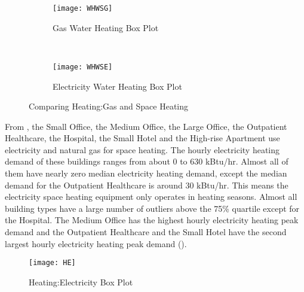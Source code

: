 \begin{figure}[h!]
  \centering
  \begin{subfigure}{0.4\textwidth}
  \centering
  \texttt{[image: WHWSG]}
  \caption[Gas Water Heating Box Plot]{Gas Water Heating Box Plot}
  \label{fig:WHWSG}
\end{subfigure}
~
\begin{subfigure}{0.4\textwidth}
  \centering
  \texttt{[image: WHWSE]}
  \caption[Electricity Water Heating Box Plot]{Electricity Water Heating Box Plot}
\end{subfigure}
\caption[Comparing Heating:Gas and Space Heating]{Comparing
  Heating:Gas and Space Heating}
\end{figure}

From , the Small Office, the Medium Office, the
Large Office, the Outpatient Healthcare, the Hospital, the Small Hotel
and the High-rise Apartment use electricity and natural gas for space
heating. The hourly electricity heating demand of these buildings
ranges from about 0 to 630 kBtu/hr. Almost all of them have nearly
zero median electricity heating demand, except the median demand for
the Outpatient Healthcare is around 30 kBtu/hr. This means the
electricity space heating equipment only operates in heating seasons.
Almost all building types have a large number of outliers above the
75\% quartile except for the Hospital. The Medium Office has the
highest hourly electricity heating peak demand and the Outpatient
Healthcare and the Small Hotel have the second largest hourly
electricity heating peak demand ().

\begin{figure}[h!]
  \centering
  \texttt{[image: HE]}
  \caption[Heating:Electricity Box Plot]{Heating:Electricity Box Plot}
  \label{fig:HE}
\end{figure}%

